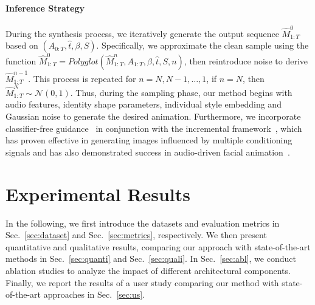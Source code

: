 \documentclass[a4paper, 10pt, conference]{ieeeconf}      %
\begin{document}
\paragraph{Inference Strategy} During the synthesis process, we iteratively generate the output sequence \( \hat{M}_{1:T}^0 \) based on \( (A_{0:T}, \hat{t}, \beta, S) \). Specifically, we approximate the clean sample using the function \(\hat{M}_{1:T}^0 = Polyglot(\hat{M}_{1:T}^n, A_{1:T}, \beta, \hat{t}, S, n)\), then reintroduce noise to derive \( \hat{M}_{1:T}^{n-1} \). This process is repeated for \( n = N, N-1, \dots, 1 \), if \(n=N\), then \(\hat{M}_{1:T}^N \sim \mathcal{N}(0, 1)\). Thus, during the sampling phase, our method begins with audio features, identity shape parameters, individual style embedding and Gaussian noise to generate the desired animation. Furthermore, we incorporate classifier-free guidance~\cite{ho2022classifierfreediffusionguidance} in conjunction with the incremental framework~\cite{brooks2023instructpix2pixlearningfollowimage},
which has proven effective in generating images influenced by multiple conditioning signals and has also demonstrated success in audio-driven facial animation~\cite{sun2023diffposetalk}. 

\section{Experimental Results}
\label{sec:experiments}
In the following, we first introduce the datasets and evaluation metrics in Sec.~\ref{sec:dataset} and Sec.~\ref{sec:metrics}, respectively. We then present quantitative and qualitative results, comparing our approach with state-of-the-art methods in Sec.~\ref{sec:quanti} and Sec.~\ref{sec:quali}. In Sec.~\ref{sec:abl}, we conduct ablation studies to analyze the impact of different architectural components. Finally, we report the results of a user study comparing our method with state-of-the-art approaches in Sec.~\ref{sec:us}.
\end{document}
